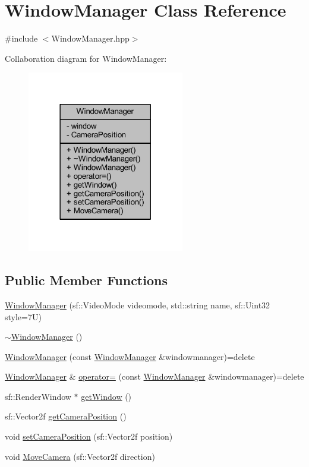 \hypertarget{class_window_manager}{\section{Window\-Manager Class Reference}
\label{class_window_manager}
}


{\ttfamily \#include $<$Window\-Manager.\-hpp$>$}



Collaboration diagram for Window\-Manager\-:
\nopagebreak
\begin{figure}[H]
\begin{center}
\leavevmode
\includegraphics[width=194pt]{class_window_manager__coll__graph}
\end{center}
\end{figure}
\subsection*{Public Member Functions}
\begin{DoxyCompactItemize}
\item 
\hyperlink{class_window_manager_a39b504521f91ffbabd88fa1e014d668d}{Window\-Manager} (sf\-::\-Video\-Mode videomode, std\-::string name, sf\-::\-Uint32 style=7\-U)
\item 
\hyperlink{class_window_manager_a19fd6e41c42760af82460d9851780d82}{$\sim$\-Window\-Manager} ()
\item 
\hyperlink{class_window_manager_aff6aee52b2c1ab9fe85027262b4b877f}{Window\-Manager} (const \hyperlink{class_window_manager}{Window\-Manager} \&windowmanager)=delete
\item 
\hyperlink{class_window_manager}{Window\-Manager} \& \hyperlink{class_window_manager_a11afbf3f6296341434679bbedb44c989}{operator=} (const \hyperlink{class_window_manager}{Window\-Manager} \&windowmanager)=delete
\item 
sf\-::\-Render\-Window $\ast$ \hyperlink{class_window_manager_a7051ab4ec34157357d2fc029b5283ba0}{get\-Window} ()
\item 
sf\-::\-Vector2f \hyperlink{class_window_manager_a6c6ca24d553fcbc205ca6eba14eea324}{get\-Camera\-Position} ()
\item 
void \hyperlink{class_window_manager_a5ee838ab6472ae7fcfd607831a8228d1}{set\-Camera\-Position} (sf\-::\-Vector2f position)
\item 
void \hyperlink{class_window_manager_abbc66e888f2a67ab0203357005bc89d8}{Move\-Camera} (sf\-::\-Vector2f direction)
\end{DoxyCompactItemize}
